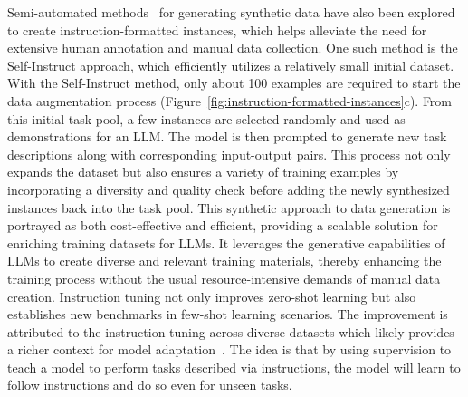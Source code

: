 Semi-automated methods~\cite{wang2022selfinstruct} for generating synthetic data have also been explored to create instruction-formatted instances, which helps alleviate the need for extensive human annotation and manual data collection.
One such method is the Self-Instruct approach, which efficiently utilizes a relatively small initial dataset.
With the Self-Instruct method, only about 100 examples are required to start the data augmentation process (Figure~\ref{fig:instruction-formatted-instances}c).
From this initial task pool, a few instances are selected randomly and used as demonstrations for an LLM. The model is then prompted to generate new task descriptions along with corresponding input-output pairs.
This process not only expands the dataset but also ensures a variety of training examples by incorporating a diversity and quality check before adding the newly synthesized instances back into the task pool.
This synthetic approach to data generation is portrayed as both cost-effective and efficient, providing a scalable solution for enriching training datasets for LLMs. It leverages the generative capabilities of LLMs to create diverse and relevant training materials, thereby enhancing the training process without the usual resource-intensive demands of manual data creation.
Instruction tuning not only improves zero-shot learning but also establishes new benchmarks in few-shot learning scenarios.
The improvement is attributed to the instruction tuning across diverse datasets which likely provides a richer context for model adaptation~\cite{wei2022fine}.
The idea is that by using supervision to teach a model to perform tasks described via instructions, the model will learn to follow instructions and do so even for unseen tasks.

